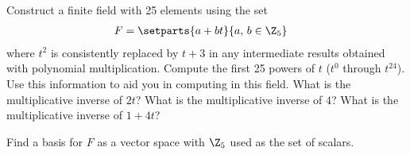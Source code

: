 Construct a finite field with 25 elements using the set
%
\begin{align*}
F&=\setparts{a+bt}{a,\,b\in\Z_5}
\end{align*}
%
where $t^2$ is consistently replaced by $t+3$ in any intermediate results obtained with polynomial multiplication.  Compute the first 25 powers of $t$ ($t^0$ through $t^{24}$).  Use this information to aid you in computing in this field.  What is the multiplicative inverse of $2t$?  What is the multiplicative inverse of $4$?  What is the multiplicative inverse of $1+4t$?\par
%
Find a basis for $F$ as a vector space with $\Z_5$ used as the set of scalars.